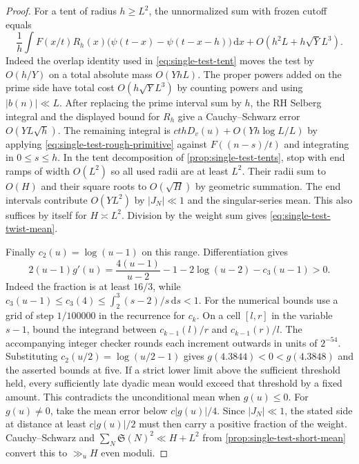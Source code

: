 \documentclass[11pt,a4paper]{article}
\numberwithin{equation}{section}
\newcommand{\SSS}{\mathfrak S}
\newcommand{\ud}{\mathrm d}
\begin{document}
\begin{proof}
For a tent of radius $h\ge L^2$, the unnormalized sum with frozen
cutoff equals
\[
 \frac1h\int F(x/t)R_h(x)
  \bigl(\psi(t-x)-\psi(t-x-h)\bigr)\,\ud x
 +O(h^2 L+h\sqrt Y L^3).
\]
Indeed the overlap identity used in \cref{eq:single-test-tent}
moves the test by $O(h/Y)$ on a total absolute mass $O(YhL)$.
The proper powers added on the prime side have total cost
$O(h\sqrt Y L^3)$ by counting powers and using $|b(n)|\ll L$.
After replacing the prime interval sum by $h$, the RH Selberg
integral and the displayed bound for $R_h$ give a Cauchy--Schwarz
error $O(YL\sqrt h)$. The remaining integral is
$cthD_v(u)+O(Yh\log L/L)$ by applying
\eqref{eq:single-test-rough-primitive} against $F((n-s)/t)$
and integrating in $0\le s\le h$.
In the tent decomposition of \cref{prop:single-test-tents}, stop
with end ramps of width $O(L^2)$ so all used radii are at least
$L^2$. Their radii sum to $O(H)$ and their square roots to
$O(\sqrt H)$ by geometric summation. The end intervals contribute
$O(YL^2)$ by $|J_N|\ll1$ and the singular-series mean. This
also suffices by itself for $H\asymp L^2$. Division by the
weight sum gives \eqref{eq:single-test-twist-mean}.

Finally $c_2(u)=\log(u-1)$ on this range. Differentiation gives
\[
 2(u-1)g'(u)=\frac{4(u-1)}{u-2}
             -1-2\log(u-2)-c_3(u-1)>0.
\]
Indeed the fraction is at least $16/3$, while
$c_3(u-1)\le c_3(4)\le\int_2^3(s-2)/s\,\ud s<1$.
For the numerical bounds use a grid of step $1/100000$ in the
recurrence for $c_k$. On a cell $[l,r]$ in the variable $s-1$,
bound the integrand between $c_{k-1}(l)/r$ and $c_{k-1}(r)/l$.
The accompanying integer checker rounds each increment outwards
in units of $2^{-54}$. Substituting $c_2(u/2)=\log(u/2-1)$
gives $g(4.3844)<0<g(4.3848)$ and the asserted bounds at five.
If a strict lower limit above the sufficient threshold held,
every sufficiently late dyadic mean would exceed that threshold
by a fixed amount. This contradicts the unconditional mean when
$g(u)\le0$. For $g(u)\ne0$, take the mean error below
$c|g(u)|/4$. Since $|J_N|\ll1$, the stated side at distance
at least $c|g(u)|/2$ must then carry a positive fraction of the
weight. Cauchy--Schwarz and $\sum_N\SSS(N)^2\ll H+L^2$ from
\cref{prop:single-test-short-mean} convert this to $\gg_u H$
even moduli.
\end{proof}
\end{document}
